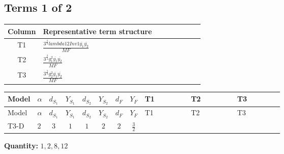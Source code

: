 \documentclass[8pt]{article}
\begin{document}
\begin{landscape}
\subsection*{Terms 1 of 2}
\begin{center}
\begin{tabular}{@{}c >{\raggedright\arraybackslash}p{0.82\linewidth}@{}}
\toprule
Column & Representative term structure \\
\midrule
T1 & \(\displaystyle \frac{3^{\frac{3}{4}} lambda12Inv1 \overline{y_{1}} \overline{y_{2}}}{MF}\) \\
\midrule
T2 & \(\displaystyle \frac{3^{\frac{3}{4}} g_{1}^{2} \overline{y_{1}} \overline{y_{2}}}{MF}\) \\
\midrule
T3 & \(\displaystyle \frac{3^{\frac{3}{4}} g_{2}^{2} \overline{y_{1}} \overline{y_{2}}}{MF}\) \\
\midrule
\bottomrule
\end{tabular}
\end{center}
\smallskip
\tiny
\begin{longtable}{@{}llcccccc >{\raggedright\arraybackslash}p{0.21\linewidth} >{\raggedright\arraybackslash}p{0.21\linewidth} >{\raggedright\arraybackslash}p{0.21\linewidth}@{}}
\toprule
Model & $\alpha$ & $d_{S_1}$ & $Y_{S_1}$ & $d_{S_2}$ & $Y_{S_2}$ & $d_F$ & $Y_F$ & T1 & T2 & T3 \\
\midrule
\endfirsthead
\toprule
Model & $\alpha$ & $d_{S_1}$ & $Y_{S_1}$ & $d_{S_2}$ & $Y_{S_2}$ & $d_F$ & $Y_F$ & T1 & T2 & T3 \\
\midrule
\endhead
T3-D & $2$ & $3$ & $1$ & $1$ & $2$ & $2$ & $\frac{3}{2}$ & \scriptsize\adjustbox{max width=\linewidth}{$\begin{gathered} \frac{3^{\frac{3}{4}} lambda12Inv1 \overline{y_{1}} \overline{y_{2}}}{6 MF}\end{gathered}$} & \scriptsize\adjustbox{max width=\linewidth}{$\begin{gathered} \frac{9 \cdot 3^{\frac{3}{4}} g_{1}^{2} \overline{y_{1}} \overline{y_{2}}}{8 MF}\end{gathered}$} & \scriptsize\adjustbox{max width=\linewidth}{$\begin{gathered} \frac{25 \cdot 3^{\frac{3}{4}} g_{2}^{2} \overline{y_{1}} \overline{y_{2}}}{24 MF}\end{gathered}$} \\
\midrule
\bottomrule
\end{longtable}
\clearpage
\noindent\textbf{Quantity: }$\mathrm{1,2,8,12}$\par\smallskip

\end{landscape}
\end{document}
